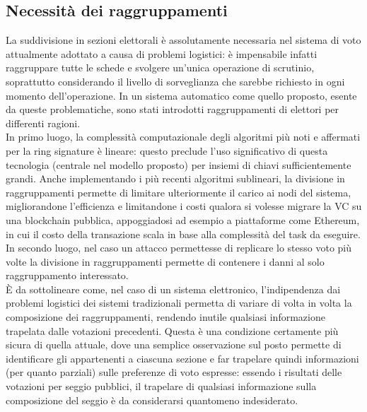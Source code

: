 	\subsection{Necessità dei raggruppamenti}
		La suddivisione in sezioni elettorali è assolutamente necessaria nel sistema di voto attualmente adottato a causa di problemi logistici: è impensabile infatti raggruppare tutte le schede e svolgere un'unica operazione di scrutinio, soprattutto considerando il livello di sorveglianza che sarebbe richiesto in ogni momento dell'operazione. In un sistema automatico come quello proposto, esente da queste problematiche, sono stati introdotti raggruppamenti di elettori per differenti ragioni. \\
		In primo luogo, la complessità computazionale degli algoritmi più noti e affermati per la ring signature è lineare: questo preclude l'uso significativo di questa tecnologia (centrale nel modello proposto) per insiemi di chiavi sufficientemente grandi. Anche implementando i più recenti algoritmi sublineari, la divisione in raggruppamenti permette di limitare ulteriormente il carico ai nodi del sistema, migliorandone l'efficienza e limitandone i costi qualora si volesse migrare la VC su una blockchain pubblica, appoggiadosi ad esempio a piattaforme come Ethereum, in cui il costo della transazione scala in base alla complessità del task da eseguire. \\
		In secondo luogo, nel caso un attacco permettesse di replicare lo stesso voto più volte la divisione in raggruppamenti permette di contenere i danni al solo raggruppamento interessato. \\
		È da sottolineare come, nel caso di un sistema elettronico, l'indipendenza dai problemi logistici dei sistemi tradizionali permetta di variare di volta in volta la composizione dei raggruppamenti, rendendo inutile qualsiasi informazione trapelata dalle votazioni precedenti. Questa è una condizione certamente più sicura di quella attuale, dove una semplice osservazione sul posto permette di identificare gli appartenenti a ciascuna sezione e far trapelare quindi informazioni (per quanto parziali) sulle preferenze di voto espresse: essendo i risultati delle votazioni per seggio pubblici, il trapelare di qualsiasi informazione sulla composizione del seggio è da considerarsi quantomeno indesiderato.
	

